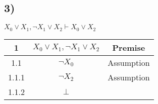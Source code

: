 \subsection*{3)}
$X_0 \vee X_1 , \neg X_1 \vee X_2 \vdash X_0 \vee X_2$\\

\begin{tabular}{c |c | c}
1 & $X_0 \vee X_1 , \neg X_1 \vee X_2$ & Premise\\
\hline
1.1 & $\neg X_0 $ & Assumption \\
1.1.1 & $\neg X_2 $ & Assumption \\
1.1.2 & $\bot$
\end{tabular}
